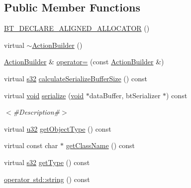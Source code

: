 \subsection*{Public Member Functions}
\begin{DoxyCompactItemize}
\item 
\mbox{\hyperlink{classnjli_1_1_action_builder_a410b750e7ae37ac7133400541cc22591}{B\+T\+\_\+\+D\+E\+C\+L\+A\+R\+E\+\_\+\+A\+L\+I\+G\+N\+E\+D\+\_\+\+A\+L\+L\+O\+C\+A\+T\+OR}} ()
\item 
virtual \mbox{\hyperlink{classnjli_1_1_action_builder_a7673ea681ab0ff5e3590e322f44798b7}{$\sim$\+Action\+Builder}} ()
\item 
\mbox{\hyperlink{classnjli_1_1_action_builder}{Action\+Builder}} \& \mbox{\hyperlink{classnjli_1_1_action_builder_ae8e386f93a681e8a4ad15c81c2317256}{operator=}} (const \mbox{\hyperlink{classnjli_1_1_action_builder}{Action\+Builder}} \&)
\item 
virtual \mbox{\hyperlink{_util_8h_aa62c75d314a0d1f37f79c4b73b2292e2}{s32}} \mbox{\hyperlink{classnjli_1_1_action_builder_a463dfb3486b50ee4b3ae234deafd9ad2}{calculate\+Serialize\+Buffer\+Size}} () const
\item 
virtual \mbox{\hyperlink{_thread_8h_af1e856da2e658414cb2456cb6f7ebc66}{void}} \mbox{\hyperlink{classnjli_1_1_action_builder_a08a4404af37bd53504e5b72e1c431442}{serialize}} (\mbox{\hyperlink{_thread_8h_af1e856da2e658414cb2456cb6f7ebc66}{void}} $\ast$data\+Buffer, bt\+Serializer $\ast$) const
\begin{DoxyCompactList}\small\item\em $<$\#\+Description\#$>$ \end{DoxyCompactList}\item 
virtual \mbox{\hyperlink{_util_8h_a10e94b422ef0c20dcdec20d31a1f5049}{u32}} \mbox{\hyperlink{classnjli_1_1_action_builder_afe754e36661339a9e9fed27aa8d98580}{get\+Object\+Type}} () const
\item 
virtual const char $\ast$ \mbox{\hyperlink{classnjli_1_1_action_builder_ad94f927c3c793b70caf04ac4170fce18}{get\+Class\+Name}} () const
\item 
virtual \mbox{\hyperlink{_util_8h_aa62c75d314a0d1f37f79c4b73b2292e2}{s32}} \mbox{\hyperlink{classnjli_1_1_action_builder_afbc316d229d1cc330b0bc432eefbf5d9}{get\+Type}} () const
\item 
\mbox{\hyperlink{classnjli_1_1_action_builder_ad3f87a956a7a92ea16a5f35f9d1608f7}{operator std\+::string}} () const
\end{DoxyCompactItemize}
